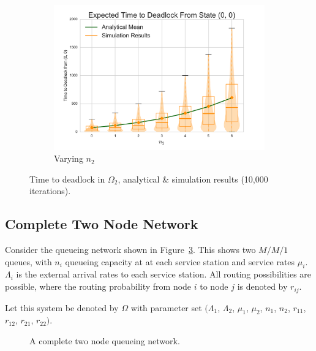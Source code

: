 \documentclass{article}
\begin{document}
\begin{center}
\begin{figure}[!htbp]
\begin{center}
\begin{subfigure}[b]{0.38\textwidth}
  \includegraphics[width=\textwidth]{images/varyn2}
  \caption{Varying $n_2$}
  \label{fig:timestodeadlock2_n2}
\end{subfigure}
\end{center}
\caption{Time to deadlock in $\Omega_2$, analytical \& simulation results (10,000 iterations).}
\label{fig:timestodeadlock2}
\end{figure}
\end{center}


\subsection{Complete Two Node Network}\label{sec:2nodeselfloops}
Consider the queueing network shown in Figure~\ref{fig:queueingnetwork_2nodesfeedback}.
This shows two \(M/M/1\) queues, with \(n_i\) queueing capacity at at each service station and service rates $\mu_i$.
$\Lambda_i$ is the external arrival rates to each service station.
All routing possibilities are possible, where the routing probability from node $i$ to node $j$ is denoted by $r_{ij}$.

Let this system be denoted by $\Omega$ with parameter set $(\Lambda_1$, $\Lambda_2$, $\mu_1$, $\mu_2$, $n_1$, $n_2$, $r_{11}$, $r_{12}$, $r_{21}$, $r_{22})$.

\begin{figure}[!htbp]
  
  \caption{A complete two node queueing network.}
  \label{fig:queueingnetwork_2nodesfeedback}
\end{figure}
\end{document}
